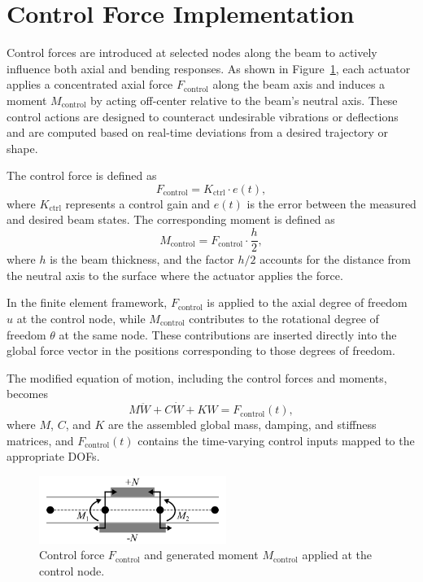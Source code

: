 \documentclass{article}
\begin{document}
	\section{Control Force Implementation}
	Control forces are introduced at selected nodes along the beam to actively influence both axial and bending responses. As shown in Figure~\ref{fig:control_forces}, each actuator applies a concentrated axial force \( F_{\text{control}} \) along the beam axis and induces a moment \( M_{\text{control}} \) by acting off-center relative to the beam’s neutral axis. These control actions are designed to counteract undesirable vibrations or deflections and are computed based on real-time deviations from a desired trajectory or shape.
	
	The control force is defined as
	\begin{equation}
		F_{\text{control}} = K_{\text{ctrl}} \cdot e(t),
	\end{equation}
	where \( K_{\text{ctrl}} \) represents a control gain and \( e(t) \) is the error between the measured and desired beam states. The corresponding moment is defined as
	\begin{equation}
		M_{\text{control}} = F_{\text{control}} \cdot \frac{h}{2},
	\end{equation}
	where \( h \) is the beam thickness, and the factor \( h/2 \) accounts for the distance from the neutral axis to the surface where the actuator applies the force.
	
	In the finite element framework, \( F_{\text{control}} \) is applied to the axial degree of freedom \( u \) at the control node, while \( M_{\text{control}} \) contributes to the rotational degree of freedom \( \theta \) at the same node. These contributions are inserted directly into the global force vector in the positions corresponding to those degrees of freedom.
	
	The modified equation of motion, including the control forces and moments, becomes
	\begin{equation}
		M \ddot{W} + C \dot{W} + K W = F_{\text{control}}(t),
	\end{equation}
	where \( M \), \( C \), and \( K \) are the assembled global mass, damping, and stiffness matrices, and \( F_{\text{control}}(t) \) contains the time-varying control inputs mapped to the appropriate DOFs.
	
	\begin{figure}[H]
		\centering
		\includegraphics[width=2.4in]{Figures/ControlForces_Figure.png}
		\caption{Control force \( F_{\text{control}} \) and generated moment \( M_{\text{control}} \) applied at the control node.}
		\label{fig:control_forces}
	\end{figure}
	
\end{document}
